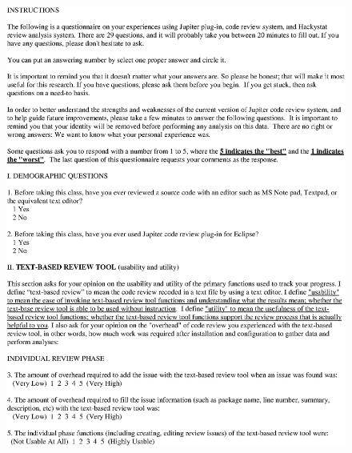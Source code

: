 \begin{figure}[htbp]
  \centering
  \includegraphics{images/appndx-4-3.eps}
  \label{appndx-4-3}
\end{figure}

